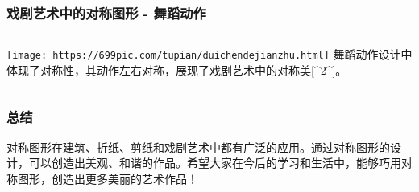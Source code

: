 \documentclass{ctexbeamer}
\begin{document}
\begin{frame}
\frametitle{戏剧艺术中的对称图形 - 舞蹈动作}
\begin{columns}
\texttt{[image: https://699pic.com/tupian/duichendejianzhu.html]}
舞蹈动作设计中体现了对称性，其动作左右对称，展现了戏剧艺术中的对称美[^2^]。
\end{columns}
\end{frame}

\begin{frame}
\frametitle{总结}
对称图形在建筑、折纸、剪纸和戏剧艺术中都有广泛的应用。通过对称图形的设计，可以创造出美观、和谐的作品。希望大家在今后的学习和生活中，能够巧用对称图形，创造出更多美丽的艺术作品！
\end{frame}
\end{document}
